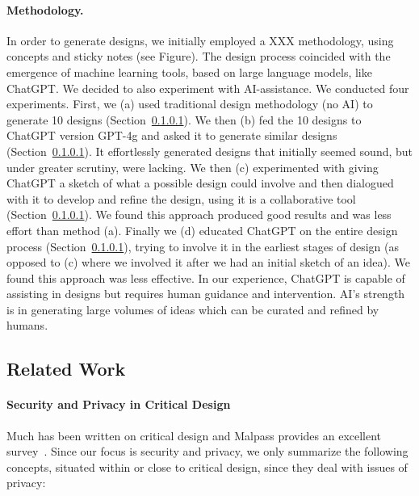 \paragraph{Methodology.} In order to generate designs, we initially employed a XXX methodology, using concepts and sticky notes (see Figure). The design process coincided with the emergence of machine learning tools, based on large language models, like ChatGPT. We decided to also experiment with AI-assistance. We conducted four experiments. First, we (a) used traditional design methodology (no AI) to generate 10 designs (Section~\ref{}). We then (b) fed the 10 designs to ChatGPT version GPT-4g and asked it to generate similar designs (Section~\ref{}). It effortlessly generated designs that initially seemed sound, but under greater scrutiny, were lacking. We then (c) experimented with giving ChatGPT a sketch of what a possible design could involve and then dialogued with it to develop and refine the design, using it is a collaborative tool (Section~\ref{}). We found this approach produced good results and was less effort than method (a). Finally we (d) educated ChatGPT on the entire design process (Section~\ref{}), trying to involve it in the earliest stages of design (as opposed to (c) where we involved it after we had an initial sketch of an idea). We found this approach was less effective. In our experience, ChatGPT is capable of assisting in designs but requires human guidance and intervention. AI's strength is in generating large volumes of ideas which can be curated and refined by humans.

\subsection{Related Work}

\paragraph{Security and Privacy in Critical Design}

Much has been written on critical design and Malpass provides an excellent survey~\cite{Mal17}. Since our focus is security and privacy, we only summarize the following concepts, situated within or close to critical design, since they deal with issues of privacy: 

